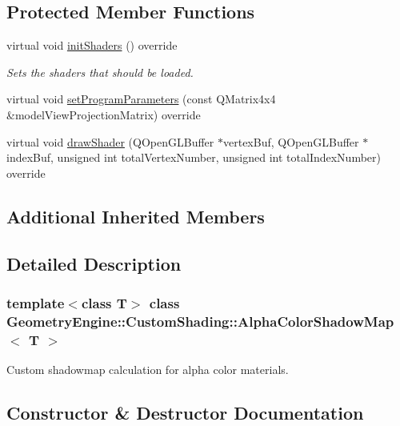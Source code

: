 \subsection*{Protected Member Functions}
\begin{DoxyCompactItemize}
\item 
\mbox{\label{class_geometry_engine_1_1_custom_shading_1_1_alpha_color_shadow_map_a8df2d7cfa4549cabe126ead5f1bd26d7}} 
virtual void \mbox{\hyperlink{class_geometry_engine_1_1_custom_shading_1_1_alpha_color_shadow_map_a8df2d7cfa4549cabe126ead5f1bd26d7}{init\+Shaders}} () override
\begin{DoxyCompactList}\small\item\em Sets the shaders that should be loaded. \end{DoxyCompactList}\item 
virtual void \mbox{\hyperlink{class_geometry_engine_1_1_custom_shading_1_1_alpha_color_shadow_map_a8e1174fd5d5ee8e5a86940b22235f8ec}{set\+Program\+Parameters}} (const Q\+Matrix4x4 \&model\+View\+Projection\+Matrix) override
\item 
virtual void \mbox{\hyperlink{class_geometry_engine_1_1_custom_shading_1_1_alpha_color_shadow_map_aa0c198d25f5486aba85f44fcd02c8074}{draw\+Shader}} (Q\+Open\+G\+L\+Buffer $\ast$vertex\+Buf, Q\+Open\+G\+L\+Buffer $\ast$index\+Buf, unsigned int total\+Vertex\+Number, unsigned int total\+Index\+Number) override
\end{DoxyCompactItemize}
\subsection*{Additional Inherited Members}


\subsection{Detailed Description}
\subsubsection*{template$<$class T$>$\newline
class Geometry\+Engine\+::\+Custom\+Shading\+::\+Alpha\+Color\+Shadow\+Map$<$ T $>$}

Custom shadowmap calculation for alpha color materials. 

\subsection{Constructor \& Destructor Documentation}
\mbox{\label{class_geometry_engine_1_1_custom_shading_1_1_alpha_color_shadow_map_ab094e1fb0b3b299584d7f0ab1fc5b924}} 
